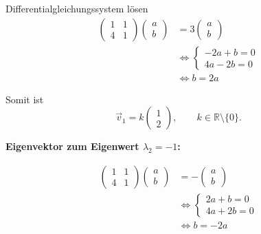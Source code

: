 \begin{bsp}{Differentialgleichungssystem lösen}{}
    \[
        \begin{aligned}
            \begin{pmatrix}
                1 & 1 \\
                4 & 1
            \end{pmatrix}
            \begin{pmatrix}a\\b\end{pmatrix}
             & =
            3\begin{pmatrix}a\\b\end{pmatrix} \\
             & \Longleftrightarrow
            \begin{cases}
                -2a+b=0 \\
                4a-2b=0
            \end{cases}                  \\
             & \Longleftrightarrow b=2a
        \end{aligned}
    \]

    Somit ist
    \[
        \vec{v}_1=k
        \begin{pmatrix}
            1 \\2
        \end{pmatrix},
        \qquad k\in\mathbb{R}\setminus\{0\}.
    \]

    \textbf{Eigenvektor zum Eigenwert \(\lambda_2=-1\):}

    \[
        \begin{aligned}
            \begin{pmatrix}
                1 & 1 \\
                4 & 1
            \end{pmatrix}
            \begin{pmatrix}a\\b\end{pmatrix}
             & =
            -\begin{pmatrix}a\\b\end{pmatrix} \\
             & \Longleftrightarrow
            \begin{cases}
                2a+b=0 \\
                4a+2b=0
            \end{cases}                  \\
             & \Longleftrightarrow b=-2a
        \end{aligned}
    \]


\end{bsp}
